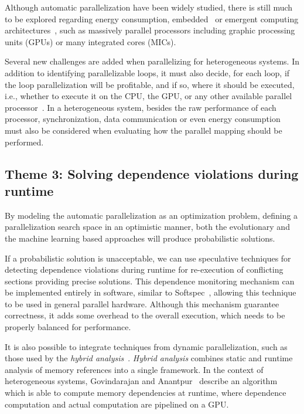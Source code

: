 \documentclass[a4paper,12pt]{article}
\begin{document}
Although automatic parallelization have been widely studied, there is still
much to be explored regarding energy consumption, embedded~\cite{cordes10} or
emergent computing
architectures~\cite{leung09,baskaran10,amini12,govindarajan13}, such as
massively parallel processors including graphic processing units (GPUs) or many
integrated cores (MICs).

Several new challenges are added when parallelizing for heterogeneous systems.
In addition to identifying parallelizable loops, it must also decide, for each
loop, if the loop parallelization will be profitable, and if so, where it
should be executed, i.e., whether to execute it on the CPU, the GPU, or any
other available parallel processor~\cite{tournavitis09,wang14a,leung09}.  In a
heterogeneous system, besides the raw performance of each processor,
synchronization, data communication or even energy consumption must also be
considered when evaluating how the parallel mapping should be performed.

\subsection{Theme 3: Solving dependence violations during runtime}

By modeling the automatic parallelization as an optimization problem,
defining a parallelization search space in an optimistic manner, both the
evolutionary and the machine learning based approaches will produce
probabilistic solutions.

If a probabilistic solution is unacceptable, we can use speculative techniques
for detecting dependence violations during runtime for re-execution of
conflicting sections providing precise solutions.  This dependence monitoring
mechanism can be implemented entirely in software, similar to
Softspec~\cite{bruening98}, allowing this technique to be used in general
parallel hardware.  Although this mechanism guarantee correctness, it adds some
overhead to the overall execution, which needs to be properly balanced for
performance.

It is also possible to integrate techniques from dynamic parallelization, such
as those used by the \emph{hybrid analysis}~\cite{rus03}. \emph{Hybrid
analysis} combines static and runtime analysis of memory references into a
single framework.  In the context of heterogeneous systems, Govindarajan and
Anantpur~\cite{govindarajan13} describe an algorithm which is able to compute
memory dependencies at runtime, where dependence computation and actual
computation are pipelined on a GPU.
\end{document}
